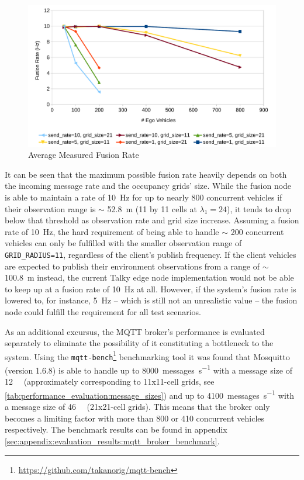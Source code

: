 \begin{figure}
	\centering
	\includegraphics[width=1.0\linewidth]{98_images/performance_evaluation_chart1}
	\caption{Average Measured Fusion Rate}
	\label{fig:performance_evaluation:fusion_rates}
\end{figure}

It can be seen that the maximum possible fusion rate heavily depends on both the incoming message rate and the occupancy grids' size. While the fusion node is able to maintain a rate of \SI{10}{\hertz} for up to nearly 800 concurrent vehicles if their observation range is $\sim$ \SI{52.8}{\meter} (11 by 11 cells at $\lambda_1 = 24$), it tends to drop below that threshold as observation rate and grid size increase. Assuming a fusion rate of \SI{10}{\hertz}, the hard requirement of being able to handle $\sim$ 200 concurrent vehicles can only be fulfilled with the smaller observation range of \texttt{GRID\_RADIUS=11}, regardless of the client's publish frequency. If the client vehicles are expected to publish their environment observations from a range of $\sim$ \SI{100.8}{\meter} instead, the current Talky edge node implementation would not be able to keep up at a fusion rate of \SI{10}{\hertz} at all. However, if the system's fusion rate is lowered to, for instance, \SI{5}{\hertz} – which is still not an unrealistic value – the fusion node could fulfill the requirement for all test scenarios.

As an additional excursus, the MQTT broker's performance is evaluated separately to eliminate the possibility of it constituting a bottleneck to the system. Using the \texttt{mqtt-bench}\footnote{\url{https://github.com/takanorig/mqtt-bench}} benchmarking tool it was found that Mosquitto (version 1.6.8) is able to handle up to \SI{8000}{messages\per\second} with a message size of \SI{12}{\kilo\byte} (approximately corresponding to 11x11-cell grids, see \cref{tab:performance_evaluation:message_sizes}) and up to \SI{4100}{messages\per\second} with a message size of \SI{46}{\kilo\byte} (21x21-cell grids). This means that the broker only becomes a limiting factor with more than 800 or 410 concurrent vehicles respectively. The benchmark results can be found in appendix \cref{sec:appendix:evaluation_results:mqtt_broker_benchmark}.
\par
\bigskip

